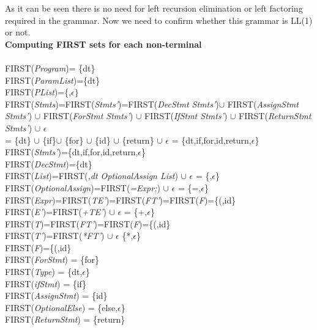\documentclass[12pt]{article}
\begin{document}
\begin{framed}
As it can be seen there is no need for left recursion elimination or left factoring required in the grammar. Now we need to confirm whether this grammar is LL(1) or not.\\

\textbf{Computing FIRST sets for each non-terminal}\\ \\
FIRST(\textit{Program})= \{dt\}\\
FIRST(\textit{ParamList})=\{dt\}\\
FIRST(\textit{PList})=\{,$\epsilon\}$\\
FIRST(\textit{Stmts})=FIRST(\textit{Stmts'})=FIRST(\textit{DecStmt Stmts'})$\cup$ FIRST(\textit{AssignStmt Stmts'}) $\cup$ FIRST(\textit{ForStmt Stmts'}) $\cup$ FIRST(\textit{IfStmt Stmts'}) $\cup$ FIRST(\textit{ReturnStmt Stmts'}) $\cup$ $\epsilon$\\
= \{dt\} $\cup$ \{if\}$\cup$ \{for\} $\cup$ \{id\} $\cup$ \{return\} $\cup$ $\epsilon$ = \{dt,if,for,id,return,$\epsilon$\}\\
FIRST(\textit{Stmts'})=\{dt,if,for,id,return,$\epsilon$\}\\
FIRST(\textit{DecStmt})=\{dt\}\\
FIRST(\textit{List})=FIRST(\textit{,dt OptionalAssign List}) $\cup$ $\epsilon$ = \{,$\epsilon$\}\\
FIRST(\textit{OptionalAssign})=FIRST(\textit{=Expr;}) $\cup$ $\epsilon$ = \{=,$\epsilon$\}\\
FIRST(\textit{Expr})=FIRST(\textit{TE'})=FIRST(\textit{FT'})=FIRST(\textit{F})=\{(,id\}\\
FIRST(\textit{E'})=FIRST(\textit{+TE'}) $\cup$ $\epsilon$ = \{+,$\epsilon$\}\\
FIRST(\textit{T})=FIRST(\textit{FT'})=FIRST(\textit{F})=\{(,id\}\\
FIRST(\textit{T'})=FIRST(\textit{*FT'}) $\cup$ $\epsilon$ \{*,$\epsilon$\}\\
FIRST(\textit{F})=\{(,id\}\\
FIRST(\textit{ForStmt}) = \{for\}\\
FIRST(\textit{Type}) = \{dt,$\epsilon$\}\\
FIRST(\textit{ifStmt}) = \{if\}\\
FIRST(\textit{AssignStmt}) = \{id\}\\
FIRST(\textit{OptionalElse}) = \{else,$\epsilon$\}\\
FIRST(\textit{ReturnStmt}) = \{return\}\\


\end{framed}
\end{document}
